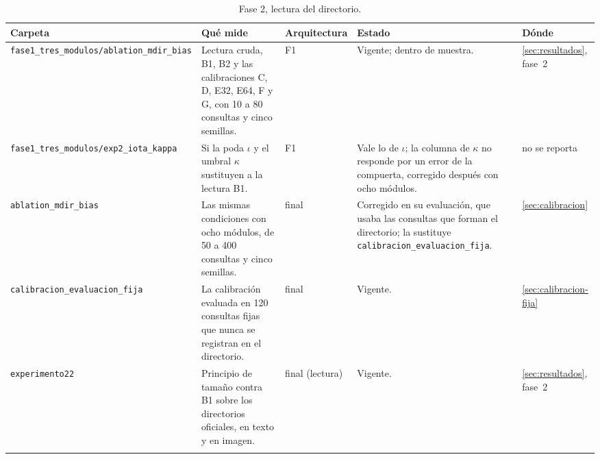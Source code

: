 \begin{table}[H]
\centering
\caption[Fase 2, lectura del directorio]{Fase 2, lectura del directorio.}
\label{tab:fase2-experimentos}
\label{tab:exp-texto}
\footnotesize
\setlength{\tabcolsep}{3pt}
\begin{tabular}{p{3.1cm}p{4.7cm}p{2.0cm}p{3.1cm}p{1.6cm}}
\toprule
Carpeta & Qué mide & Arquitectura & Estado & Dónde \tabularnewline
\midrule
\raggedright \texttt{fase1\_\allowbreak tres\_\allowbreak modulos/\allowbreak ablation\_\allowbreak mdir\_\allowbreak bias} &
\raggedright Lectura cruda, B1, B2 y las calibraciones C, D, E32, E64, F y G, con 10 a 80 consultas y cinco semillas. &
\raggedright F1 &
\raggedright Vigente; dentro de muestra. &
\raggedright \ref{sec:resultados}, fase~2 \tabularnewline\addlinespace[4pt]
\raggedright \texttt{fase1\_\allowbreak tres\_\allowbreak modulos/\allowbreak exp2\_\allowbreak iota\_\allowbreak kappa} &
\raggedright Si la poda $\iota$ y el umbral $\kappa$ sustituyen a la lectura B1. &
\raggedright F1 &
\raggedright Vale lo de $\iota$; la columna de $\kappa$ no responde por un error de la compuerta, corregido después con ocho módulos. &
\raggedright no se reporta \tabularnewline\addlinespace[4pt]
\raggedright \texttt{ablation\_\allowbreak mdir\_\allowbreak bias} &
\raggedright Las mismas condiciones con ocho módulos, de 50 a 400 consultas y cinco semillas. &
\raggedright final &
\raggedright Corregido en su evaluación, que usaba las consultas que forman el directorio; la sustituye \texttt{calibracion\_\allowbreak evaluacion\_\allowbreak fija}. &
\raggedright \ref{sec:calibracion} \tabularnewline\addlinespace[4pt]
\raggedright \texttt{calibracion\_\allowbreak evaluacion\_\allowbreak fija} &
\raggedright La calibración evaluada en 120 consultas fijas que nunca se registran en el directorio. &
\raggedright final &
\raggedright Vigente. &
\raggedright \ref{sec:calibracion-fija} \tabularnewline\addlinespace[4pt]
\raggedright \texttt{experimento22} &
\raggedright Principio de tamaño contra B1 sobre los directorios oficiales, en texto y en imagen. &
\raggedright final (lectura) &
\raggedright Vigente. &
\raggedright \ref{sec:resultados}, fase~2 \tabularnewline\addlinespace[4pt]
\bottomrule
\end{tabular}
\end{table}

